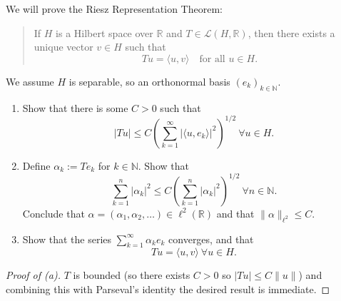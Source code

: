 \begin{prob*}[2]
    We will prove the Riesz Representation Theorem:

    \begin{quote}
        If \(H\) is a Hilbert space over \(\mathbb{R}\) and
        \(T \in \mathcal{L}(H,\mathbb{R})\), then there exists a unique
        vector \(v \in H\) such that
        \[
            Tu = \langle u,v\rangle
            \quad \text{for all } u \in H.
        \]
    \end{quote}

    We assume $H$ is separable, so an orthonormal basis 
    $(e_k)_{k\in\mathbb N}$.

    \begin{enumerate}[label=\alph*)]
        \item Show that there is some $C > 0$ such that 
            \[
                |Tu| \leq C \left(\sum_{k=1}^\infty |\langle 
                u, e_k\rangle|^2\right)^{1/2} \ 
                \forall u \in H.
            \]
        \item Define $\alpha_k := Te_k$ for $k \in \mathbb N$. 
            Show that 
            \[
                \sum_{k=1}^n|\alpha_k|^2 \leq 
                C\left(\sum_{k=1}^n|\alpha_k|^2\right)^{1/2} 
                \ 
                \forall n \in \mathbb N.
            \]
            Conclude that $\alpha = (\alpha_1,\alpha_2,\ldots) \in 
            \ell^2(\mathbb R)$ and that $\|\alpha\|_{\ell^2} \le C$.
        \item Show that the series $\sum_{k=1}^\infty \alpha_k e_k$
            converges, and that 
            \[
                Tu = \langle u,v\rangle \ \forall u \in H.
            \]
    \end{enumerate}
\end{prob*}
\begin{proof}[Proof of (a)]
    $T$ is bounded (so there 
    exists $C > 0$ so $|Tu| \leq C\|u\|$) and combining 
    this with Parseval's identity the desired result is immediate.
\end{proof}

